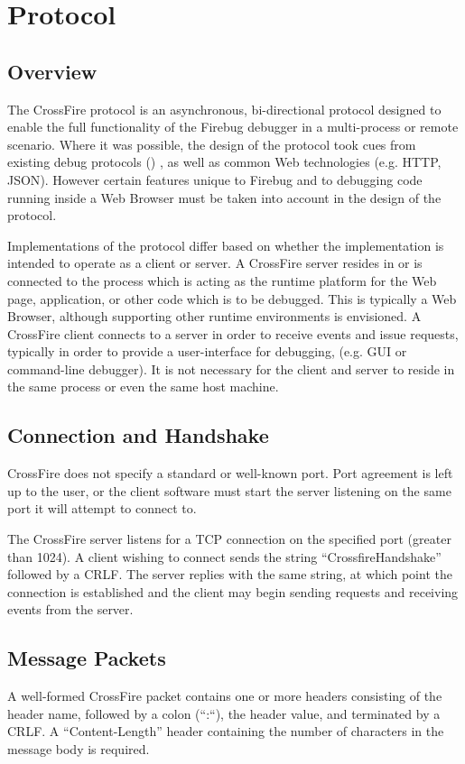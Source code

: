 \section {Protocol}
\subsection {Overview}
The CrossFire protocol is an asynchronous, bi-directional protocol designed to
enable the full functionality of the Firebug debugger in a multi-process or
remote scenario. Where it was possible, the design of the protocol took cues
from existing debug protocols () , as well as common Web technologies (e.g.
HTTP\cite{http}, JSON\cite{json}). However certain features unique to Firebug
and to debugging code running inside a Web Browser must be taken into account in
the design of the protocol.

Implementations of the protocol differ based on whether the implementation is
intended to operate as a client or server. A CrossFire server resides in or is
connected to the process which is acting as the runtime platform for the Web
page, application, or other code which is to be debugged. This is typically a
Web Browser, although supporting other runtime environments is envisioned. A
CrossFire client connects to a server in order to receive events and issue
requests, typically in order to provide a user-interface
for debugging, (e.g. GUI or command-line debugger). It is not necessary for the
client and server to reside in the same process or even the same host machine.

\subsection {Connection and Handshake}
CrossFire does not specify a standard or well-known port. Port agreement is left
up to the user, or the client software must start the server listening on
the same port it will attempt to connect to.

The CrossFire server listens for a TCP connection on the specified port
(greater than 1024).  A client wishing to connect sends the string
``CrossfireHandshake'' followed by a CRLF. The server replies with the same
string, at which point the connection is established and the client may begin
sending requests and receiving events from the server.

\subsection {Message Packets}
A well-formed CrossFire packet contains one or more headers consisting of the
header name, followed by a colon (``:``), the header value, and terminated by a
CRLF. A ``Content-Length'' header containing the number of characters in the
message body is required.

